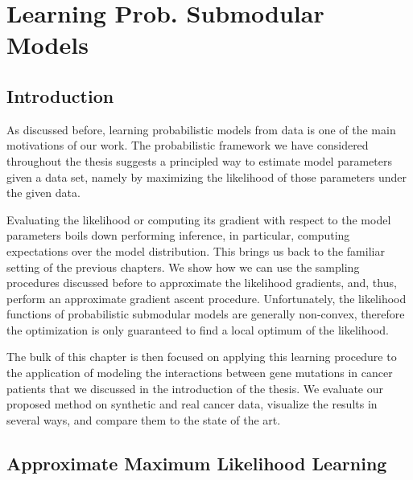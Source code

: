 \chapter{Learning Prob. Submodular Models} \label{ch:genes}

\section{Introduction}
As discussed before, learning probabilistic models from data is one of the main motivations of our work.
The probabilistic framework we have considered throughout the thesis suggests a principled way to estimate model parameters given a data set, namely by maximizing the likelihood of those parameters under the given data.

Evaluating the likelihood or computing its gradient with respect to the model parameters boils down performing inference, in particular, computing expectations over the model distribution.
This brings us back to the familiar setting of the previous chapters.
We show how we can use the sampling procedures discussed before to approximate the likelihood gradients, and, thus, perform an approximate gradient ascent procedure.
Unfortunately, the likelihood functions of probabilistic submodular models are generally non-convex, therefore the optimization is only guaranteed to find a local optimum of the likelihood.

The bulk of this chapter is then focused on applying this learning procedure to the application of modeling the interactions between gene mutations in cancer patients that we discussed in the introduction of the thesis.
We evaluate our proposed method on synthetic and real cancer data, visualize the results in several ways, and compare them to the state of the art.

\section{Approximate Maximum Likelihood Learning} \label{sect:ml}

